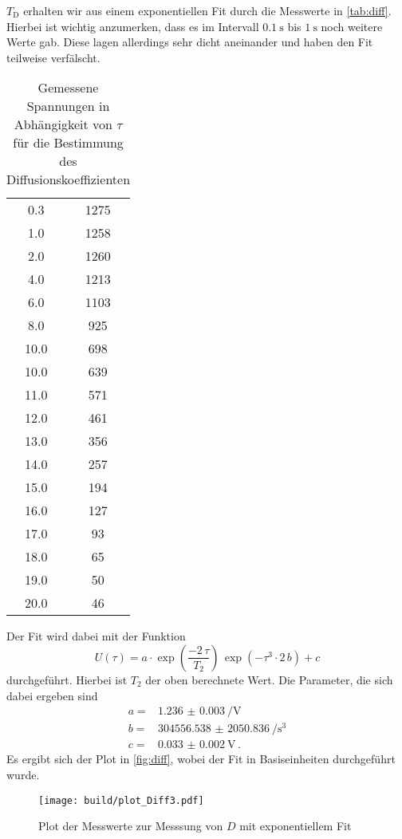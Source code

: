 $T_\text{D}$ erhalten wir aus einem exponentiellen Fit durch die Messwerte in \autoref{tab:diff}.
Hierbei ist wichtig anzumerken, dass es im Intervall $\SI{0.1}{\second}$ bis $\SI{1}{\second}$ noch weitere Werte gab.
Diese lagen allerdings sehr dicht aneinander und haben den Fit teilweise verfälscht.

\begin{table}
    \centering
    \caption{Gemessene Spannungen in Abhängigkeit von $\tau$ für die Bestimmung des Diffusionskoeffizienten}
    \label{tab:diff}
    \begin{tabular}{S[table-format=2.1] S[table-format=4.0]}
        \toprule
        \tableSI{\tau}{\milli\second} &   \\
         & 1275 \\
        1.0 & 1258 \\
        2.0 & 1260 \\
        4.0 & 1213 \\
        6.0 & 1103 \\
        8.0 & 925 \\
        10.0 & 698 \\
        10.0 & 639 \\
        11.0 & 571 \\
        12.0 & 461 \\
        13.0 & 356 \\
        14.0 & 257 \\
        15.0 & 194 \\
        16.0 & 127 \\
        17.0 & 93 \\
        18.0 & 65 \\
        19.0 & 50 \\
        20.0 & 46 \\
        \bottomrule
    \end{tabular}
\end{table}

Der Fit wird dabei mit der Funktion 
\begin{equation}
    U(\tau) = a \cdot \exp(\frac{- 2\,  \tau}{T_2}) \, \exp(- \tau ^3 \cdot 2 \, b) + c 
    \label{eq:fit_d}
\end{equation}
durchgeführt.
Hierbei ist $T_2$ der oben berechnete Wert.
Die Parameter, die sich dabei ergeben sind 
\begin{align*}
    a =& \SI{1.236(3)}{\per\volt} \\
    b =& \SI{304556.538(2050836)}{\per\cubic\second} \\
    c =& \SI{0.033(2)}{\volt} \, .
\end{align*}
Es ergibt sich der Plot in \autoref{fig:diff}, wobei der Fit in Basiseinheiten durchgeführt wurde.
\begin{figure}
    \centering
    \texttt{[image: build/plot\_Diff3.pdf]}
    \caption{Plot der Messwerte zur Messsung von $D$ mit exponentiellem Fit}
    \label{fig:diff}
\end{figure}

